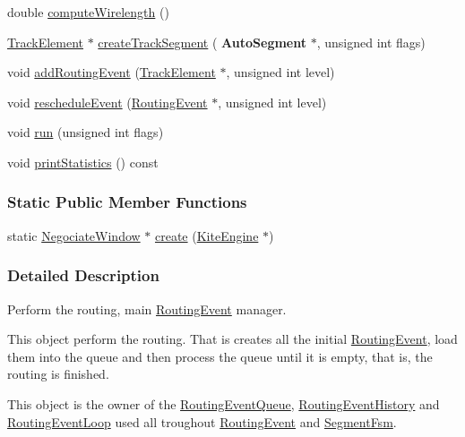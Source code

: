 \begin{DoxyCompactItemize}
\item 
double \mbox{\hyperlink{classKite_1_1NegociateWindow_a4936106670361df6b6f3ef0b6088c9dc}{compute\+Wirelength}} ()
\item 
\mbox{\hyperlink{classKite_1_1TrackElement}{Track\+Element}} $\ast$ \mbox{\hyperlink{classKite_1_1NegociateWindow_a7bf31fcd4e4007e62454689ef7c553fc}{create\+Track\+Segment}} (\textbf{ Auto\+Segment} $\ast$, unsigned int flags)
\item 
void \mbox{\hyperlink{classKite_1_1NegociateWindow_a51ba8e6a122c0cb93174027658cade63}{add\+Routing\+Event}} (\mbox{\hyperlink{classKite_1_1TrackElement}{Track\+Element}} $\ast$, unsigned int level)
\item 
void \mbox{\hyperlink{classKite_1_1NegociateWindow_acad8f73494d122463d65797d337ce275}{reschedule\+Event}} (\mbox{\hyperlink{classKite_1_1RoutingEvent}{Routing\+Event}} $\ast$, unsigned int level)
\item 
void \mbox{\hyperlink{classKite_1_1NegociateWindow_a61e848b73b597f54e2e83e13eb70ff83}{run}} (unsigned int flags)
\item 
void \mbox{\hyperlink{classKite_1_1NegociateWindow_a8d3dfaa30cedabd6b64977827ac989d8}{print\+Statistics}} () const
\end{DoxyCompactItemize}
\subsubsection*{Static Public Member Functions}
\begin{DoxyCompactItemize}
\item 
static \mbox{\hyperlink{classKite_1_1NegociateWindow}{Negociate\+Window}} $\ast$ \mbox{\hyperlink{classKite_1_1NegociateWindow_ad9c37ea1398a6dfa332cb297141dc1c4}{create}} (\mbox{\hyperlink{classKite_1_1KiteEngine}{Kite\+Engine}} $\ast$)
\end{DoxyCompactItemize}


\subsubsection{Detailed Description}
Perform the routing, main \mbox{\hyperlink{classKite_1_1RoutingEvent}{Routing\+Event}} manager. 

This object perform the routing. That is creates all the initial \mbox{\hyperlink{classKite_1_1RoutingEvent}{Routing\+Event}}, load them into the queue and then process the queue until it is empty, that is, the routing is finished.

This object is the owner of the \mbox{\hyperlink{classKite_1_1RoutingEventQueue}{Routing\+Event\+Queue}}, \mbox{\hyperlink{classKite_1_1RoutingEventHistory}{Routing\+Event\+History}} and \mbox{\hyperlink{classKite_1_1RoutingEventLoop}{Routing\+Event\+Loop}} used all troughout \mbox{\hyperlink{classKite_1_1RoutingEvent}{Routing\+Event}} and \mbox{\hyperlink{classKite_1_1SegmentFsm}{Segment\+Fsm}}. 


